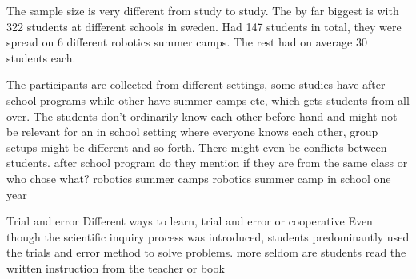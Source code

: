 \bigskip\noindent
The sample size is very different from study to study. The by far biggest is \cite{lindh2007does} with 322 students at different schools in sweden. \cite{nugent2009use} Had 147 students in total, they were spread on 6 different robotics summer camps. The rest had on average 30 students each.

\bigskip\noindent
The participants are collected from different settings, some studies have after school programs while other have summer camps etc, which gets students from all over. The students don't ordinarily know each other before hand and might not be relevant for an in school setting where everyone knows each other, group setups might be different and so forth. There might even be conflicts between students.
\cite{barker2007robotics} after school program do they mention if they are from the same class or who chose what?
\cite{nugent2009use} robotics summer camps
\cite{williams2007acquisition} robotics summer camp
\cite{lindh2007does} in school one year

\bigskip\noindent
Trial and error 
\cite{lindh2007does} Different ways to learn, trial and error or cooperative
\cite{williams2007acquisition} Even though the scientific inquiry process was introduced, students predominantly used the trials and error method to solve problems. 
\cite{lindh2007does}more seldom are students read the written instruction from the teacher or book

